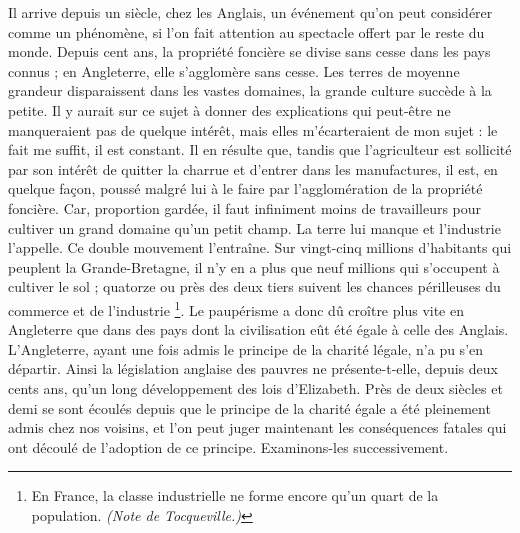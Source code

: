 \documentclass[french,twoside]{book} %
\begin{document}
Il arrive depuis un siècle, chez les Anglais, un événement qu’on peut considérer comme un phénomène, si l’on fait attention au spectacle offert par le reste du monde. Depuis cent ans, la propriété foncière se divise sans cesse dans les pays connus ; en Angleterre, elle s’agglomère sans cesse. Les terres de moyenne grandeur disparaissent dans les vastes domaines, la grande culture succède à la petite. Il y aurait sur ce sujet à donner des explications qui peut-être ne manqueraient pas de quelque intérêt, mais elles m’écarteraient de mon sujet : le fait me suffit, il est constant. Il en résulte que, tandis que l’agriculteur est sollicité par son intérêt de quitter la charrue et d’entrer dans les manufactures, il est, en quelque façon, poussé malgré lui à le faire par l’agglomération de la propriété foncière. Car, proportion gardée, il faut infiniment moins de travailleurs pour cultiver un grand domaine qu’un petit champ. La terre lui manque et l’industrie l’appelle. Ce double mouvement l’entraîne. Sur vingt-cinq millions d’habitants qui peuplent la Grande-Bretagne, il n’y en a plus que neuf millions qui s’occupent à cultiver le sol ; quatorze ou près des deux tiers suivent les chances périlleuses du commerce et de l’industrie \footnote{En France, la classe industrielle ne forme encore qu’un quart de la population. \emph{(Note de Tocqueville.)}}. Le paupérisme a donc dû croître plus vite en Angleterre que dans des pays dont la civilisation eût été égale à celle des Anglais. L'Angleterre, ayant une fois admis le principe de la charité légale, n’a pu s’en départir. Ainsi la législation anglaise des pauvres ne présente-t-elle, depuis deux cents ans, qu’un long développement des lois d’Elizabeth. Près de deux siècles et demi se sont écoulés depuis que le principe de la charité égale a été pleinement admis chez nos voisins, et l’on peut juger maintenant les conséquences fatales qui ont découlé de l’adoption de ce principe. Examinons-les successivement.\par
\end{document}

